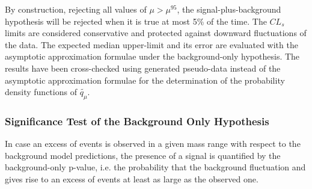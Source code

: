 By construction, rejecting all values of $\mu > \mu^{95}$, the signal-plus-background hypothesis will be 
rejected when it is true at most 5\% of the time.
The $CL_{s}$ limits are considered conservative and  protected against downward  fluctuations of the data.
%
%	
%
The expected median upper-limit and its error are evaluated with the asymptotic approximation formulae under the background-only hypothesis.
The results have been cross-checked using generated pseudo-data instead of the asymptotic approximation formulae for the determination
of the  probability density functions of $\tilde{q_{\mu}}$. 


\subsubsection{Significance Test of the Background Only Hypothesis}
In case an excess of events is observed  in a given mass range with respect to the background model predictions,
the presence of a signal is quantified by the background-only p-value,
 i.e. the probability that the background fluctuation
and gives rise to an excess of events at least as large as the observed one.


